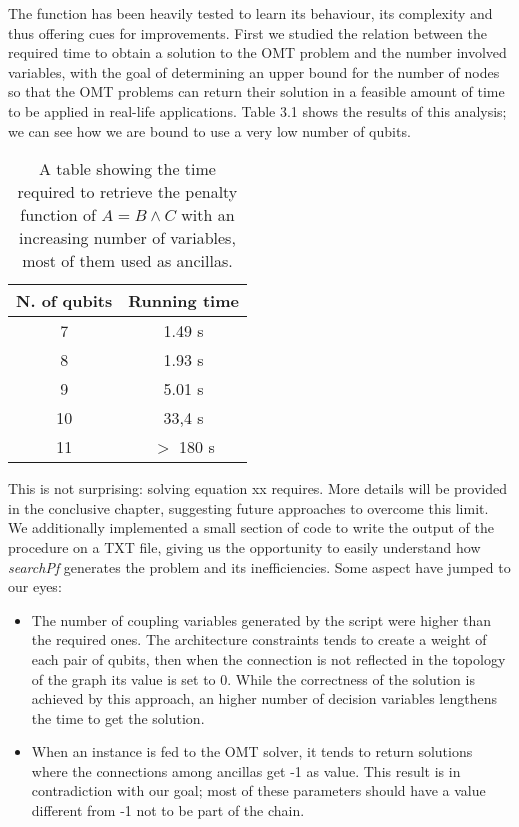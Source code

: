 The function has been heavily tested to learn its behaviour, its complexity and thus offering cues for improvements. First we studied the relation between the required time to obtain a solution to the OMT problem and the number involved variables, with the goal of determining an upper bound for the number of nodes so that the OMT problems can return their solution in a feasible amount of time to be applied in real-life applications. Table 3.1 shows the results of this analysis; we can see how we are bound to use a very low number of qubits.
\begin{table}[]
\centering
\begin{tabular}{|c|c|}
\hline
\rowcolor[HTML]{FFCC67} 
N. of qubits & Running time \\ \hline
7            & 1.49 s       \\ \hline
8            & 1.93 s       \\ \hline
9            & 5.01 s       \\ \hline
10           & 33,4 s       \\ \hline
11           & $>$ 180 s      \\ \hline
\end{tabular}
\caption{A table showing the time required to retrieve the penalty function of $A = B \wedge C$ with an increasing number of variables, most of them used as ancillas.}
\label{tab:my-table}
\end{table}
This is not surprising: solving equation xx requires. More details will be provided in the conclusive chapter, suggesting future approaches to overcome this limit. \\
We additionally implemented a small section of code to write the output of the procedure on a TXT file, giving us the opportunity to easily understand how \textit{searchPf} generates the problem and its inefficiencies. Some aspect have jumped to our eyes:

\begin{itemize}
    \item The number of coupling variables generated by the script were higher than the required ones. The architecture constraints tends to create a weight of each pair of qubits, then when the connection is not reflected in the topology of the graph its value is set to 0. While the correctness of the solution is achieved by this approach, an higher number of decision variables lengthens the time to get the solution.
    \item When an instance is fed to the OMT solver, it tends to return solutions where the connections among ancillas get -1 as value. This result is in contradiction with our goal; most of these parameters should have a value different from -1 not to be part of the chain.
\end{itemize}

\newpage


